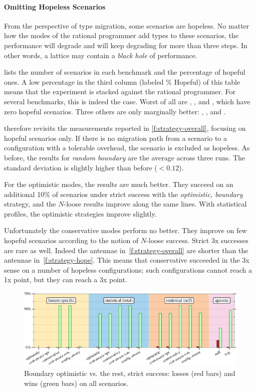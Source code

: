 \paragraph{Omitting Hopeless Scenarios} From the perspective of type migration,
some scenarios are hopeless. No matter how the modes of the rational programmer
add types to these scenarios, the performance will degrade and will keep
degrading for more than three steps. In other words, a lattice may contain a
\emph{black hole} of performance. 

 lists the number of scenarios in each benchmark and the
percentage of hopeful ones. A low percentage in the third column (labeled \%
Hopeful) of this table means that the experiment is stacked against the rational
programmer.  For several benchmarks, this is indeed the case.  Worst of all are
, , and , which have zero hopeful
scenarios.  Three others are only marginally better: ,
, and .

 therefore revisits the measurements reported in
\cref{f:strategy-overall}, focusing on hopeful scenarios only.  If there is no
migration path from a scenario to a configuration with a tolerable overhead, the
scenario is excluded as hopeless.  As before, the results for \emph{random
boundary} are the average across three runs.  The standard deviation is slightly
higher than before ($<0.12$).

For the optimistic modes, the results are much better.  They succeed on an
additional 10\% of scenarios under strict success with the \emph{optimistic,
boundary} strategy, and the $N$-loose results improve along the same lines.
With statistical profiles, the optimistic strategies improve slightly.

Unfortunately the conservative modes perform no better.  They improve on few
hopeful scenarios according to the notion of $N$-loose success.  Strict 3x
successes are rare as well.  Indeed the antennae in~\cref{f:strategy-overall}
are shorter than the antennae in~\cref{f:strategy-hope}.  This means that
conservative succeeded in the 3x sense on a number of hopeless configurations;
such configurations cannot reach a 1x point, but they can reach a 3x point.


\begin{figure}[ht]
  \includegraphics[width=0.9\columnwidth]{data/head-to-head.pdf}
  \caption{Boundary optimistic vs. the rest, strict success: losses (red bars) and wins (green bars) on all scenarios.}
  \label{f:head-to-head}
\end{figure}

